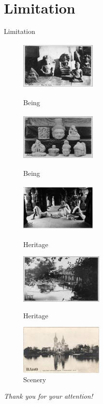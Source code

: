\documentclass[12pt]{beamer}
\begin{document}
\section{Limitation}
\begin{frame}{Limitation}
\begin{figure}[!htb]
\captionsetup[subfigure]{labelformat=empty}

\begin{minipage}{0.25\linewidth}
  \includegraphics[height=2.5cm, width=3.8cm]{images/being_heritage_0181}\hfill
  \caption*{Being}
\end{minipage}
\hfill
\begin{minipage}{0.28\linewidth}
  \includegraphics[height=2.5cm, width=3.8cm]{images/being_heritage_1116.jpg}\hfill
  \caption*{Being}
\end{minipage}%
\hfill
\begin{minipage}{0.31\linewidth}
  \includegraphics[height=2.5cm, width=3.8cm]{images/heritage_being_0487.jpg}%
  \caption*{Heritage}
\end{minipage}%
\par

\begin{minipage}{0.25\linewidth}
  \includegraphics[height=2.5cm]{images/heritage_scenery_0215.jpg}\hfill
  \caption*{Heritage}
\end{minipage}
\hfill
\begin{minipage}{0.34\linewidth}
  \includegraphics[height=2.5cm]{images/scenery_heritage_0073.jpg}\hfill
  \caption*{Scenery}
\end{minipage}%
\end{figure}
\end{frame}

\begin{frame}{}
  \centering \Large
  \emph{Thank you for your attention!}
\end{frame}
\end{document}
